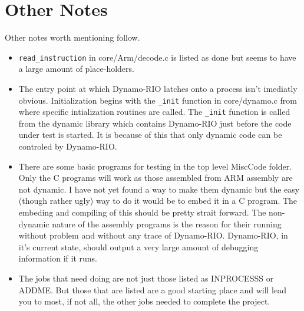 \documentclass[a4paper]{article}
\begin{document}
\section{Other Notes}
Other notes worth mentioning follow.
\begin{itemize}
\item \texttt{read\_instruction} in core/Arm/decode.c is listed as done but seems to have
a large amount of place-holders.
\item The entry point at which Dynamo-RIO latches onto a process isn't imediatly
obvious. Initialization begins with the \texttt{\_init} function in core/dynamo.c
from where specific intialization routines are called. The \texttt{\_init}
function is called from the dynamic library which contains Dynamo-RIO just
before the code under test is started. It is because of this that only dynamic
code can be controled by Dynamo-RIO.
\item There are some basic programs for testing in the top level MiscCode
folder. Only the C programs will work as those assembled from ARM assembly are
not dynamic. I have not yet found a way to make them dynamic but the easy
(though rather ugly) way to do it would be to embed it in a C program. The
embeding and compiling of this should be pretty strait forward. The non-dynamic
nature of the assembly programs is the reason for their running without problem
and without any trace of Dynamo-RIO. Dynamo-RIO, in it's current state, should
output a very large amount of debugging information if it runs.
\item The jobs that need doing are not just those listed as INPROCESSS or ADDME.
But those that are listed are a good starting place and will lead you to most,
if not all, the other jobs needed to complete the project.
\end{itemize}
\end{document}
